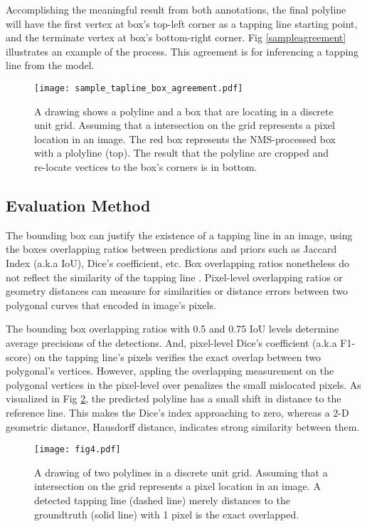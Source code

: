 \documentclass[default,pdflatex,iicol]{sn-jnl}%
\begin{document}
Accomplishing the meaningful result from both annotations, the final polyline will have the first vertex at box's top-left corner as a tapping line starting point, and the terminate vertex at box's bottom-right corner. Fig \ref{sampleagreement} illustrates an example of the process. This agreement is for inferencing a tapping line from the model.
\begin{figure}[h]%
\centering
\texttt{[image: sample\_tapline\_box\_agreement.pdf]}
\caption{A drawing shows a polyline and a box that are locating in a discrete unit grid. Assuming that a intersection on the grid represents a pixel location in an image. The red box represents the NMS-processed box with a plolyline (top). The result that the polyline are cropped and re-locate vectices to the box's corners is in bottom.
}\label{fig4-sampleagreement}
\end{figure}

\subsection{Evaluation Method}
The bounding box can justify the existence of a tapping line in an image, using the boxes overlapping ratios between predictions and priors such as Jaccard Index (a.k.a IoU), Dice's coefficient, etc. Box overlapping ratios nonetheless do not reflect the similarity of the tapping line \cite{Wongtanawijit_2021}. Pixel-level overlapping ratios or geometry distances can measure for similarities or distance errors between two polygonal curves that encoded in image's pixels.

The bounding box overlapping ratios with 0.5 and 0.75 IoU levels determine average precisions of the detections. And, pixel-level Dice's coefficient (a.k.a F1-score) on the tapping line's pixels verifies the exact overlap between two polygonal's vertices. However, appling the overlapping measurement on the polygonal vertices in the pixel-level over penalizes the small mislocated pixels. As visualized in Fig \ref{fig4-polyline}, the predicted polyline has a small shift in distance to the reference line. This makes the Dice's index approaching to zero, whereas a 2-D geometric distance, Hausdorff distance, indicates strong similarity between them.

\begin{figure}[h]%
\centering
\texttt{[image: fig4.pdf]}
\caption{A drawing of two polylines in a discrete unit grid. Assuming that a intersection on the grid represents a pixel location in an image. A detected tapping line (dashed line) merely distances to the groundtruth (solid line) with 1 pixel is the exact overlapped.}\label{fig4-polyline}
\end{figure}
\end{document}
